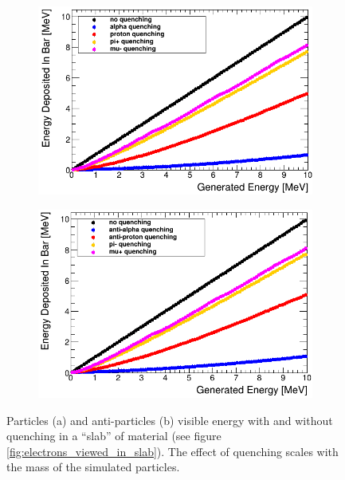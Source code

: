 \begin{figure}[!h]
\centering
\begin{subfigure}{.45\textwidth}
  \centering
  \includegraphics[width=\linewidth]{Chapter4/Figs/particleQuenchingeExample_adjusted.png}
  \captionsetup{width=.9\linewidth}
  \caption{}
  \label{subFig:proton_quenched_and_not}
\end{subfigure}%
\begin{subfigure}{.45\textwidth}
  \centering
  \includegraphics[width=\linewidth]{Chapter4/Figs/antiParticleQuenchingeExample_adjusted.png}
  \captionsetup{width=.9\linewidth}
  \caption{}
  \label{subFig:Aproton_quenched_and_not}
\end{subfigure}
\caption{Particles (a) and anti-particles (b) visible energy with and without quenching in a ``slab'' of material (see figure \ref{fig:electrons_viewed_in_slab}). The effect of quenching scales with the mass of the simulated particles.}
\label{fig:proton_Apronton_quenched_and_not}
\end{figure}

